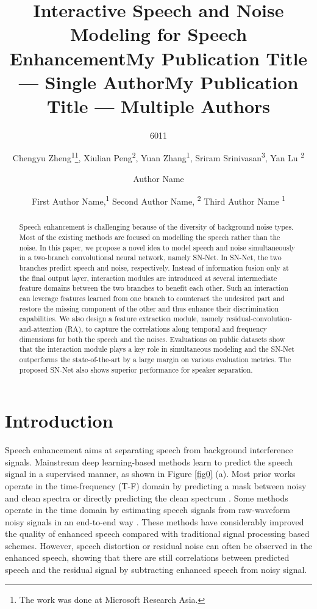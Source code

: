 \documentclass[letterpaper]{article} \usepackage{snnet}  \usepackage{times}  \usepackage{helvet} \usepackage{courier}  \usepackage[hyphens]{url}  \usepackage{graphicx} \urlstyle{rm} \def\UrlFont{\rm}  \usepackage{graphicx}  \usepackage{natbib}  \usepackage{caption} \usepackage{amsfonts}  \usepackage{amsmath}  \usepackage{multirow} \usepackage{tablefootnote}  \usepackage[switch]{lineno}
\title{Interactive Speech and Noise Modeling for Speech Enhancement}
\author{
    6011
}
\author {
Chengyu Zheng\textsuperscript{\rm 1}\thanks{The work was done at Microsoft Research Asia.},
        Xiulian Peng\textsuperscript{\rm 2},
        Yuan Zhang\textsuperscript{\rm 1},
        Sriram Srinivasan\textsuperscript{\rm 3},
        Yan Lu \textsuperscript{\rm 2} \\
}
\title{My Publication Title --- Single Author}
\author {
Author Name \\
}
\title{My Publication Title --- Multiple Authors}
\author {


        First Author Name,\textsuperscript{\rm 1}
        Second Author Name, \textsuperscript{\rm 2}
        Third Author Name \textsuperscript{\rm 1} \\
}
\begin{document}
\maketitle
\begin{abstract}
    Speech enhancement is challenging because of the diversity of background noise types. Most of the existing methods are focused on modelling the speech rather than the noise. In this paper, we propose a novel idea to model speech and noise simultaneously in a two-branch convolutional neural network, namely SN-Net. In SN-Net, the two branches predict speech and noise, respectively. Instead of information fusion only at the final output layer, interaction modules are introduced at several intermediate feature domains between the two branches to benefit each other. Such an interaction can leverage features learned from one branch to counteract the undesired part and restore the missing component of the other and thus enhance their discrimination capabilities. We also design a feature extraction module, namely residual-convolution-and-attention (RA), to capture the correlations along temporal and frequency dimensions for both the speech and the noises. Evaluations on public datasets show that the interaction module plays a key role in simultaneous modeling and the SN-Net outperforms the state-of-the-art by a large margin on various evaluation metrics. The proposed SN-Net also shows superior performance for speaker separation. 
\end{abstract}

\section{Introduction}
\noindent Speech enhancement aims at separating speech from background interference signals. Mainstream deep learning-based methods learn to predict the speech signal in a supervised manner, as shown in Figure \ref{fig0} (a). Most prior works operate in the time-frequency (T-F) domain by predicting a mask between noisy and clean spectra \cite{wang2014IRM, williamson2015complex} or directly predicting the clean spectrum \cite{xu2013experimental, tan2018convolutional}. Some methods operate in the time domain by estimating speech signals from raw-waveform noisy signals in an end-to-end way \cite{fu2017raw, pascual2017segan, pandey2019tcnn}. These methods have considerably improved the quality of enhanced speech compared with traditional signal processing based schemes. However, speech distortion or residual noise can often be observed in the enhanced speech, showing that there are still correlations between predicted speech and the residual signal by subtracting enhanced speech from noisy signal.
\end{document}
